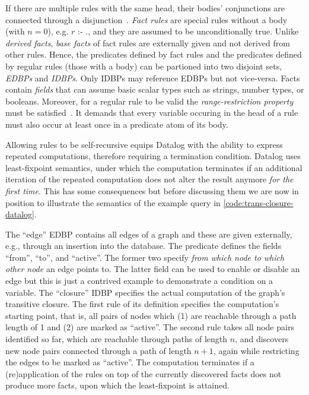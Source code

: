 If there are multiple rules with the same head, their bodies' conjunctions
are connected through a disjunction~\cite{abo2024convergence}.
\emph{Fact rules} are special rules without a body (with $n=0$), e.g.
\( r \text{ :- } .\), and they are assumed to be unconditionally true.
Unlike \emph{derived facts}, \emph{base facts} of fact rules are externally
given and not derived from other rules.
Hence, the predicates defined by fact rules and the predicates defined by regular
rules (those with a body) can be partioned into two disjoint sets,
\emph{\acp{EDBP}} and \emph{\acp{IDBP}}. Only \acp{IDBP} may reference \acp{EDBP}
but not vice-versa.
Facts contain \emph{fields} that can assume basic scalar types such as strings,
number types, or booleans.
Moreover, for a regular rule to be valid the \emph{range-restriction property}
must be satisfied~\cite{green2013datalog}.
It demands that every variable occuring in the head of a rule must also occur
at least once in a predicate atom of its body.

Allowing rules to be self-recursive equips Datalog with the ability to express
repeated computations, therefore requiring a termination condition.
Datalog uses least-fixpoint semantics, under which the computation terminates
if an additional iteration of the repeated computation does not alter the result
anymore \emph{for the first time}.
This has some consequences but before discussing them we are now in position
to illustrate the semantics of the example query in \ref{code:trans-closure-datalog}.

The ``edge'' \ac{EDBP} contains all edges of a graph and these are given
externally, e.g., through an insertion into the database.
The predicate defines the fields ``from'', ``to'', and ``active''.
The former two specify \emph{from which node to which other node} an edge points to.
The latter field can be used to enable or disable an edge but this is just
a contrived example to demonstrate a condition on a variable.
The ``closure'' \ac{IDBP} specifies the actual computation of the graph's
transitive closure.
The first rule of its definition specifies the computation's starting point,
that is, all pairs of nodes which (1) are reachable through a path length of 1
and (2) are marked as ``active''.
The second rule takes all node pairs identified so far, which are reachable
through paths of length \(n\), and discovers new node pairs connected
through a path of length \(n + 1\),
again while restricting the edges to be marked as ``active''.
The computation terminates if a (re)application of the rules on top of the
currently discovered facts does not produce more facts,
upon which the least-fixpoint is attained.


